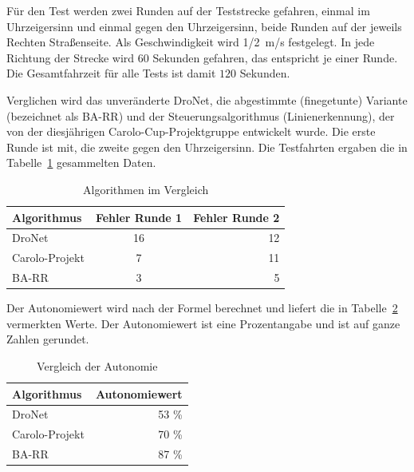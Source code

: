 Für den Test werden zwei Runden auf der Teststrecke gefahren, einmal im Uhrzeigersinn und einmal gegen den Uhrzeigersinn, beide Runden auf der jeweils Rechten Straßenseite. Als Geschwindigkeit wird \SI{1/2}{\meter/\second} festgelegt. In jede Richtung der Strecke wird $60$ Sekunden gefahren, das entspricht je einer Runde. Die Gesamtfahrzeit für alle Tests ist damit $120$ Sekunden.

Verglichen wird das unveränderte DroNet, die abgestimmte (finegetunte) Variante (bezeichnet als BA-RR) und der Steuerungsalgorithmus (Linienerkennung), der von der diesjährigen Carolo-Cup-Projektgruppe entwickelt wurde. Die erste Runde ist mit, die zweite gegen den Uhrzeigersinn. Die Testfahrten ergaben die in Tabelle~\ref{tab:testfahrten} gesammelten Daten.



\begin{table}[h]
  \begin{center}
    \caption{Algorithmen im Vergleich}
    \label{tab:testfahrten}
    \begin{tabular}{l|c|r} %
      \textbf{Algorithmus} & \textbf{Fehler Runde 1} & \textbf{Fehler Runde 2}\\
      \hline
      DroNet & 16 & 12\\
      Carolo-Projekt & 7 & 11\\
       BA-RR& 3 & 5\\
    \end{tabular}
  \end{center}
\end{table}

Der Autonomiewert wird nach der Formel berechnet und liefert die in Tabelle~\ref{tab:autonomie} vermerkten Werte. Der Autonomiewert ist eine Prozentangabe und ist auf ganze Zahlen gerundet.

\begin{table}[h]
  \begin{center}
    \caption{Vergleich der Autonomie}
    \label{tab:autonomie}
    \begin{tabular}{l|r} %
      \textbf{Algorithmus} & \textbf{Autonomiewert} \\
      \hline
      DroNet & 53 \% \\
      Carolo-Projekt & 70 \%  \\
       BA-RR& 87 \% \\
    \end{tabular}
  \end{center}
\end{table}

